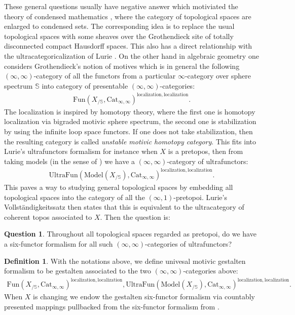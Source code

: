 \documentclass[12pt]{article}
\theoremstyle{definition}
\newtheorem{definition}{Definition}
\newtheorem{question}{Question}
\begin{document}
These general questions usually have negative answer which motiviated the theory of condensed mathematics \cite{CS1} \cite{CS2} \cite{CS3}, where the category of topological spaces are enlarged to condensed sets. The corresponding idea is to replace the usual topological spaces with some sheaves over the Grothendieck site of totally disconnected compact Hausdorff spaces. This also has a direct relationship with the ultracategoricalization of Lurie \cite{5Lu3}. On the other hand in algebraic geometry one considers Grothendieck's notion of motives which is in general the following $(\infty,\infty)$-category of all the functors from a particular $\infty$-category over sphere spectrum $\mathbb{S}$ into category of presentable $(\infty,\infty)$-categories:
\begin{align}
\mathrm{Fun}(X_{/\mathbb{S}},\mathrm{Cat}_{\infty,\infty})^\mathrm{localization, localization}.
\end{align}
The localization is inspired by homotopy theory, where the first one is homotopy localization via bigraded motivic sphere spectrum, the second one is stabilization by using the infinite loop space functors. If one does not take stabilization, then the resulting category is called \textit{unstable motivic homotopy category}. This fits into Lurie's ultrafunctors formalism for instance when $X$ is a pretopos, then from taking models (in the sense of \cite{5Lu3}) we have a $(\infty,\infty)$-category of ultrafunctors:
\begin{align}
\mathrm{UltraFun}(\mathrm{Model}(X_{/\mathbb{S}}),\mathrm{Cat}_{\infty,\infty})^\mathrm{localization, localization}.
\end{align}
This paves a way to studying general topological spaces by embedding all topological spaces into the category of all the $(\infty,1)$-pretopoi. Lurie's Vollst\"andigkeitssatz then states that this is equivalent to the ultracategory of coherent topos associated to $X$. Then the question is:

\begin{question}
Throughout all topological spaces regarded as pretopoi, do we have a six-functor formalism for all such $(\infty,\infty)$-categories of ultrafunctors?  
\end{question}

\begin{definition}
With the notations above, we define univesal motivic gestalten formalism to be gestalten associated to the two $(\infty,\infty)$-categories above:
\begin{align}
\mathrm{Fun}(X_{/\mathbb{S}},\mathrm{Cat}_{\infty,\infty})^\mathrm{localization, localization},
\mathrm{UltraFun}(\mathrm{Model}(X_{/\mathbb{S}}),\mathrm{Cat}_{\infty,\infty})^\mathrm{localization, localization}.
\end{align}
When $X$ is changing we endow the gestalten six-functor formalism via countably presented mappings pullbacked from the six-functor formalism from \cite{5S5}.
\end{definition}
\end{document}
